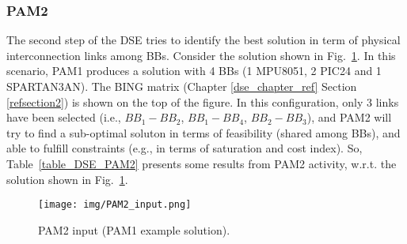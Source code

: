 \subsubsection{PAM2}
%
The second step of the DSE tries to identify the best solution in term of physical interconnection links among BBs. Consider the solution shown in Fig.~\ref{pam2_sol_input}. 
In this scenario, PAM1 produces a solution with 4 BBs (1 MPU8051, 2 PIC24 and 1 SPARTAN3AN). The BING matrix (Chapter \ref{dse_chapter_ref} Section \ref{refsection2}) is shown on the top of the figure. In this configuration, only 3 links have been selected (i.e., $BB_1 - BB_2$, $BB_1 - BB_4$, $BB_2 - BB_3$), and PAM2 will try to find a sub-optimal soluton in terms of feasibility (shared among BBs), and able to fulfill constraints (e.g., in terms of saturation and cost index). So, Table~\ref{table_DSE_PAM2} presents some results from PAM2 activity, w.r.t. the solution shown in Fig.~\ref{pam2_sol_input}.
%
\begin{figure}[htbp]
	\centerline{\texttt{[image: img/PAM2\_input.png]}}
	\caption{PAM2 input (PAM1 example solution).}
	\label{pam2_sol_input}
\end{figure}
%
%
\begin{table}[htbp]
\caption{Design Space Exploration in PAM2.}
\begin{center}
\label{table_DSE_PAM2}
\end{center}
\end{table}
% 
%
